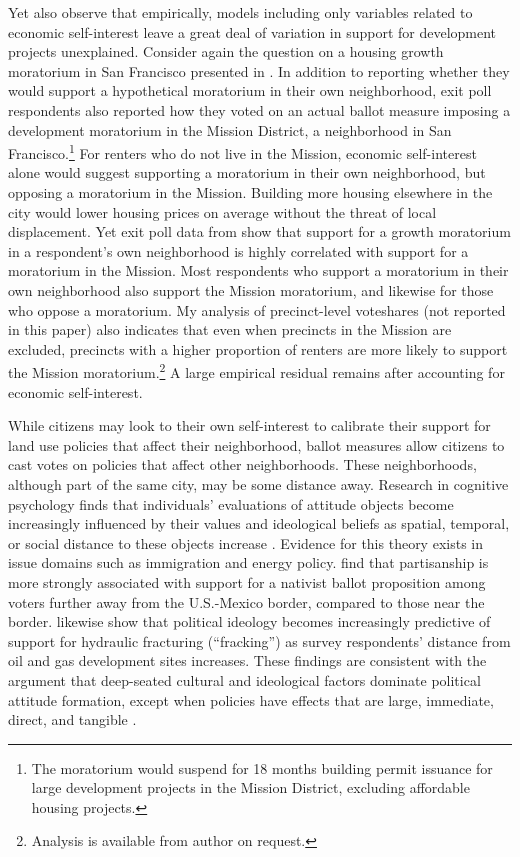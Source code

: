 \documentclass[article,12pt]{memoir}
\begin{document}
Yet \citet{gerber_development_2003} also observe that empirically, models including only variables related to economic self-interest leave a great deal of variation in support for development projects unexplained. Consider again the question on a housing growth moratorium in San Francisco presented in \citet{hankinson_when_2018}. In addition to reporting whether they would support a hypothetical moratorium in their own neighborhood, exit poll respondents also reported how they voted on an actual ballot measure imposing a development moratorium in the Mission District, a neighborhood in San Francisco.\footnote{The moratorium would suspend for 18 months building permit issuance for large development projects in the Mission District, excluding affordable housing projects.} For renters who do not live in the Mission, economic self-interest alone would suggest supporting a moratorium in their own neighborhood, but opposing a moratorium in the Mission. Building more housing elsewhere in the city would lower housing prices on average without the threat of local displacement. Yet exit poll data from \citeauthor{hankinson_when_2018} show that support for a growth moratorium in a respondent's own neighborhood is highly correlated with support for a moratorium in the Mission. Most respondents who support a moratorium in their own neighborhood also support the Mission moratorium, and likewise for those who oppose a moratorium. My analysis of precinct-level voteshares (not reported in this paper) also indicates that even when precincts in the Mission are excluded, precincts with a higher proportion of renters are more likely to support the Mission moratorium.\footnote{Analysis is available from author on request.} A large empirical residual remains after accounting for economic self-interest.

While citizens may look to their own self-interest to calibrate their support for land use policies that affect their neighborhood, ballot measures allow citizens to cast votes on policies that affect other neighborhoods. These neighborhoods, although part of the same city, may be some distance away. Research in cognitive psychology finds that individuals' evaluations of attitude objects become increasingly influenced by their values and ideological beliefs as spatial, temporal, or social distance to these objects increase \citep{trope_temporal_2003,trope_construal-level_2010}. Evidence for this theory exists in issue domains such as immigration and energy policy. \citet{branton_anglo_2007} find that partisanship is more strongly associated with support for a nativist ballot proposition among voters further away from the U.S.-Mexico border, compared to those near the border. \citet{clarke_how_2016} likewise show that political ideology becomes increasingly predictive of support for hydraulic fracturing (``fracking'') as survey respondents' distance from oil and gas development sites increases. These findings are consistent with the argument that deep-seated cultural and ideological factors dominate political attitude formation, except when policies have effects that are large, immediate, direct, and tangible \citep{sears_tax_1985,sears_limited_1990,sears_role_1991}.
\end{document}
